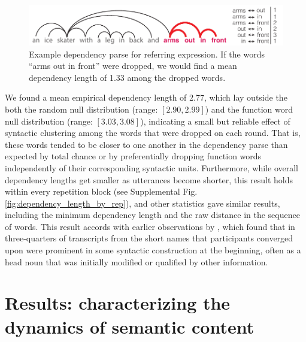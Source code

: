 \documentclass[alpha-refs]{wiley-article}
\begin{document}
\begin{figure}[b!]
\centering
\vspace{-1em}
\includegraphics[scale=.75]{dependency.pdf}
\caption{Example dependency parse for referring expression. If the words ``arms out in front'' were dropped, we would find a mean dependency length of 1.33 among the dropped words.} 
\label{fig:dependency}
\end{figure}

We found a mean empirical dependency length of 2.77, which lay outside the both the random null distribution (range: $[2.90, 2.99]$) and the function word null distribution (range: $[3.03, 3.08]$), indicating a small but reliable effect of syntactic clustering among the words that were dropped on each round.
That is, these words tended to be closer to one another in the dependency parse than expected by total chance or by preferentially dropping function words independently of their corresponding syntactic units.
Furthermore, while overall dependency lengths get smaller as utterances become shorter, this result holds within every repetition block (see Supplemental Fig. \ref{fig:dependency_length_by_rep}), and other statistics gave similar results, including the minimum dependency length and the raw distance in the sequence of words. 
This result accords with earlier observations by \cite{Carroll80_NamingHedges}, which found that in three-quarters of transcripts from \cite{KraussWeinheimer64_ReferencePhrases} the short names that participants converged upon were prominent in some syntactic construction at the beginning, often as a head noun that was initially modified or qualified by other information. 

\section{Results: characterizing the dynamics of semantic content}
\label{sec:content} 
\end{document}
